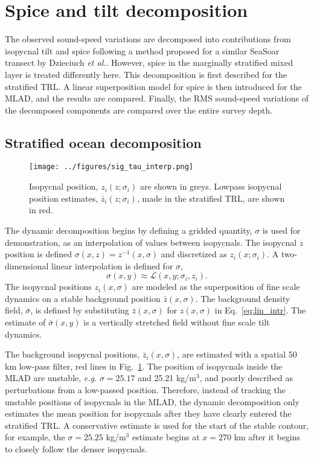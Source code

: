 \documentclass[preprint,NumberedRefs]{JASA}
\begin{document}
\section{\label{sec:decomposition}Spice and tilt decomposition}
The observed sound-speed variations are decomposed into contributions from isopycnal tilt and spice following a method proposed for a similar SeaSoar transect by Dzieciuch \emph{et al.}.\citep{dzieciuch2004} However, spice in the marginally stratified mixed layer is treated differently here. This decomposition is first described for the stratified TRL. A linear superposition model for spice is then introduced for the MLAD, and the results are compared. Finally, the RMS sound-speed variations of the decomposed components are compared over the entire survey depth.

\subsection{Stratified ocean decomposition}
\begin{figure}
\texttt{[image: ../figures/sig\_tau\_interp.png]}
    \caption{\label{fig:cntrs}{Isopycnal position, $z_i(z; \sigma_i)$ are shown in greys. Lowpass isopycnal position estimates, $\bar{z}_i(z; \sigma_i)$, made in the stratified TRL, are shown in red.}}
\end{figure}

The dynamic decomposition begins by defining a gridded quantity, $\sigma$ is used for demonstration, as an interpolation of values between isopycnals. The isopycnal $z$ position is defined $\sigma(x, z) = z^{-1}(x, \sigma)$ and discretized as $z_i(x; \sigma_i)$. A two-dimensional linear interpolation is defined for $\sigma$,
\begin{equation}
    \sigma(x,y)\approx\mathcal{L}(x, y; \sigma_i, z_i).
    \label{eq:lin_intr}
\end{equation}
The isopycnal positions $z_i(x, \sigma)$ are modeled as the superposition of fine scale dynamics on a stable background position $\bar{z}(x, \sigma)$. The background density field, $\bar{\sigma}$, is defined by substituting $\bar{z}(x, \sigma)$ for $z(x, \sigma)$ in Eq.~\eqref{eq:lin_intr}. The estimate of $\bar{\sigma}(x,y)$ is a vertically stretched field without fine scale tilt dynamics.

The background isopycnal positions, $\bar{z}_i(x, \sigma)$, are estimated with a spatial 50 km low-pass filter, red lines in Fig.~\ref{fig:cntrs}. The position of isopycnals inside the MLAD are unstable, \emph{e.g.} $\sigma=25.17$ and 25.21 kg/m$^3$, and poorly described as perturbations from a low-passed position. Therefore, instead of tracking the unstable positions of isopycnals in the MLAD, the dynamic decomposition only estimates the mean position for isopycnals after they have clearly entered the stratified TRL. A conservative estimate is used for the start of the stable contour, for example, the $\sigma=25.25$ kg/m$^3$ estimate begins at $x=270$ km after it begins to closely follow the denser isopycnals.
\end{document}
